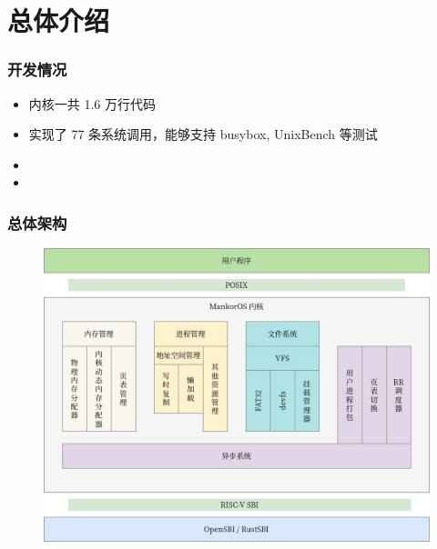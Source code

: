 \section{总体介绍}

\begin{frame}
    \frametitle{开发情况}

    \begin{itemize}
        \item 内核一共 1.6 万行代码
        \item 实现了 77 条系统调用，能够支持 busybox, UnixBench 等测试
        \item {}
        \item {}
    \end{itemize}

\end{frame}

\begin{frame}
    \frametitle{总体架构}
    \begin{figure}
        \includegraphics[width=.6\textwidth]{assets/Arch.jpg}
    \end{figure}

\end{frame}

